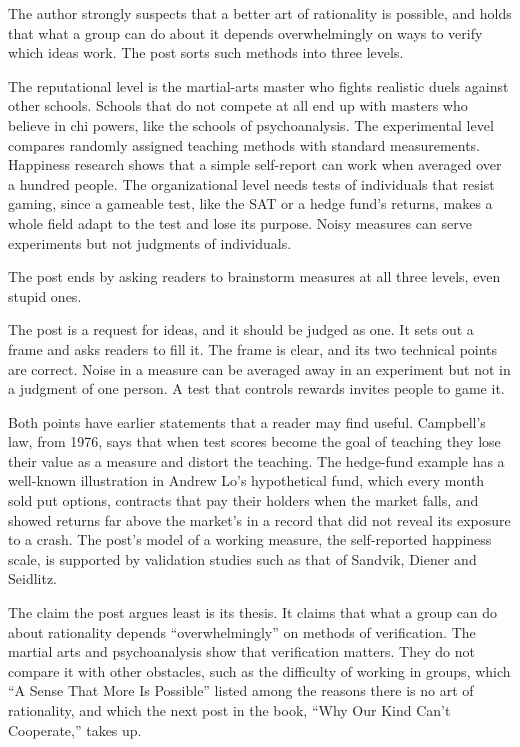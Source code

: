 \begin{afterword}
\summaryhead

The author strongly suspects that a better art of rationality is possible, and holds that what a group can do about it depends overwhelmingly on ways to verify which ideas work. The post sorts such methods into three levels.

The reputational level is the martial-arts master who fights realistic duels against other schools. Schools that do not compete at all end up with masters who believe in chi powers, like the schools of psychoanalysis. The experimental level compares randomly assigned teaching methods with standard measurements. Happiness research shows that a simple self-report can work when averaged over a hundred people. The organizational level needs tests of individuals that resist gaming, since a gameable test, like the SAT or a hedge fund's returns, makes a whole field adapt to the test and lose its purpose. Noisy measures can serve experiments but not judgments of individuals.

The post ends by asking readers to brainstorm measures at all three levels, even stupid ones.

\responsehead

The post is a request for ideas, and it should be judged as one. It sets out a frame and asks readers to fill it. The frame is clear, and its two technical points are correct. Noise in a measure can be averaged away in an experiment but not in a judgment of one person. A test that controls rewards invites people to game it.

Both points have earlier statements that a reader may find useful. Campbell's law, from 1976, says that when test scores become the goal of teaching they lose their value as a measure and distort the teaching. The hedge-fund example has a well-known illustration in Andrew Lo's hypothetical fund, which every month sold put options, contracts that pay their holders when the market falls, and showed returns far above the market's in a record that did not reveal its exposure to a crash. The post's model of a working measure, the self-reported happiness scale, is supported by validation studies such as that of Sandvik, Diener and Seidlitz.

The claim the post argues least is its thesis. It claims that what a group can do about rationality depends ``overwhelmingly'' on methods of verification. The martial arts and psychoanalysis show that verification matters. They do not compare it with other obstacles, such as the difficulty of working in groups, which ``A Sense That More Is Possible'' listed among the reasons there is no art of rationality, and which the next post in the book, ``Why Our Kind Can't Cooperate,'' takes up.


\end{afterword}
